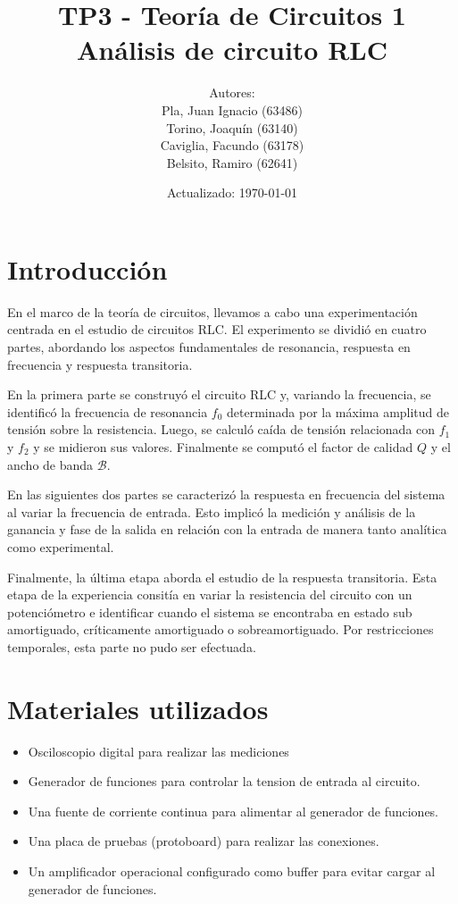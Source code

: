 \documentclass[a4paper,12pt]{article}
\title{TP3 - Teoría de Circuitos 1\\Análisis de circuito RLC}
\author{Autores: \\Pla, Juan Ignacio (63486)\\Torino, Joaquín (63140)\\Caviglia, Facundo (63178)\\Belsito, Ramiro (62641)}
\date{Actualizado: \today}
\begin{document}
\maketitle

\section{Introducción}
\hspace{1cm}En el marco de la teoría de circuitos, llevamos a cabo una experimentación centrada en el estudio de circuitos RLC.
 El experimento se dividió en cuatro partes, abordando los aspectos fundamentales de resonancia,
  respuesta en frecuencia y respuesta transitoria.

\hspace{1cm}En la primera parte se construyó el circuito RLC y, variando la frecuencia, se identificó
 la frecuencia de resonancia $f_0$ determinada por la máxima amplitud de tensión sobre
  la resistencia. Luego, se calculó caída de tensión relacionada con $f_1$ y $f_2$ y 
  se midieron sus valores. Finalmente se computó el factor de calidad $Q$ y el ancho 
  de banda $\mathcal{B}$.

\hspace{1cm}En las siguientes dos partes se caracterizó la respuesta en frecuencia del sistema 
al variar la frecuencia de entrada. Esto implicó la medición y análisis de la ganancia y 
fase de la salida en relación con la entrada de manera tanto analítica como experimental.

\hspace{1cm}Finalmente, la última etapa aborda el estudio de la respuesta transitoria. 
Esta etapa de la experiencia consitía en variar la resistencia del circuito con un 
potenciómetro e identificar cuando el sistema se encontraba en estado sub 
amortiguado, críticamente amortiguado o sobreamortiguado. 
Por restricciones temporales, esta parte no pudo ser efectuada.

\section{Materiales utilizados}

\begin{itemize}
\item Osciloscopio digital para realizar las mediciones
\item Generador de funciones para controlar la tension de entrada al circuito.
\item Una fuente de corriente continua para alimentar al generador de funciones.
\item Una placa de pruebas (protoboard) para realizar las conexiones.
\item Un amplificador operacional configurado como buffer para evitar cargar al generador de funciones.
\end{itemize}
\end{document}
